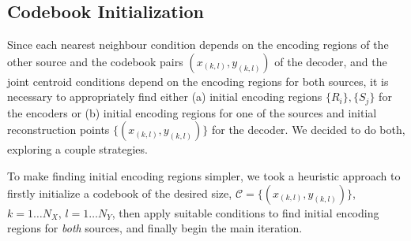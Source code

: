 



\subsection{Codebook Initialization}

Since each nearest neighbour condition depends on the encoding regions of the other source and the codebook pairs $(x_{(k,l)},y_{(k,l)})$ of the decoder, and the joint centroid conditions depend on the encoding regions for both sources, it is necessary to appropriately find either (a) initial encoding regions $\{R_i\}, \{S_j\}$ for the encoders or (b) initial encoding regions for one of the sources and initial reconstruction points $\{(x_{(k,l)}, y_{(k,l)})\}$ for the decoder. We decided to do both, exploring a couple strategies.


To make finding initial encoding regions simpler, we took a heuristic approach to firstly initialize a codebook of the desired size, $\mathcal C=\{(x_{(k,l)}, y_{(k,l)})\}$, $k=1\ldots N_X$, $l=1\ldots N_Y$, then apply suitable conditions to find initial encoding regions for \emph{both} sources, and finally begin the main iteration.

